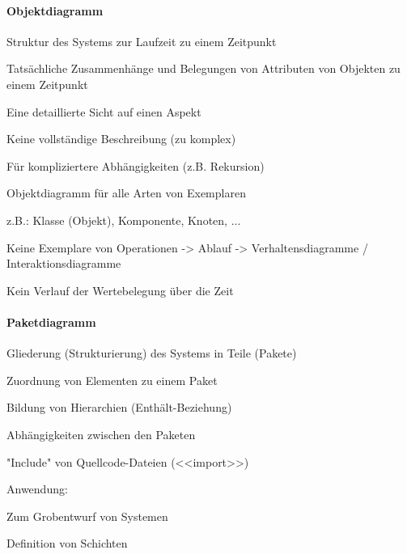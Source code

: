 \documentclass[a4paper]{article}
\begin{document}
\begin{multicols}{3}
  \paragraph{Objektdiagramm}
  \begin{itemize*}
    \item Struktur des Systems zur Laufzeit zu einem Zeitpunkt
    \item Tatsächliche Zusammenhänge und Belegungen von Attributen von Objekten zu einem Zeitpunkt
    \item Eine detaillierte Sicht auf einen Aspekt
          \begin{itemize*}
            \item Keine vollständige Beschreibung (zu komplex)
            \item Für kompliziertere Abhängigkeiten (z.B. Rekursion)
          \end{itemize*}
    \item Objektdiagramm für alle Arten von Exemplaren
          \begin{itemize*}
            \item z.B.: Klasse (Objekt), Komponente, Knoten, ...
          \end{itemize*}
    \item Keine Exemplare von Operationen -> Ablauf -> Verhaltensdiagramme / Interaktionsdiagramme
    \item Kein Verlauf der Wertebelegung über die Zeit
  \end{itemize*}

  \paragraph{Paketdiagramm}
  \begin{itemize*}
    \item Gliederung (Strukturierung) des Systems in Teile (Pakete)
    \item Zuordnung von Elementen zu einem Paket
    \item Bildung von Hierarchien (Enthält-Beziehung)
    \item Abhängigkeiten zwischen den Paketen
          \begin{itemize*}
            \item "Include" von Quellcode-Dateien (<<import>>)
          \end{itemize*}
    \item Anwendung:
          \begin{itemize*}
            \item Zum Grobentwurf von Systemen
            \item Definition von Schichten
          \end{itemize*}
  \end{itemize*}


\end{multicols}
\end{document}
